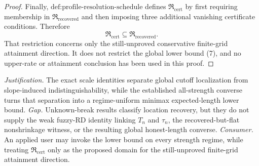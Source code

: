 \documentclass{article}
\begin{document}
\begin{proof}
Finally, \(\text{def:profile-resolution-schedule}\) defines \(\mathfrak R_{\mathrm{cert}}\) by first requiring membership in \(\mathfrak R_{\mathrm{recovered}}\) and then imposing three additional vanishing certificate conditions.  Therefore
\[
 \mathfrak R_{\mathrm{cert}}\subseteq\mathfrak R_{\mathrm{recovered}}.
\]
That restriction concerns only the still-unproved conservative finite-grid attainment direction.  It does not restrict the global lower bound (7), and no upper-rate or attainment conclusion has been used in this proof.
\end{proof}
\par\smallskip\noindent \textit{Justification.} The exact scale identities separate global cutoff localization from slope-induced indistinguishability, while the established all-strength converse turns that separation into a regime-uniform minimax expected-length lower bound. \textit{Gap.} Unknown-break results classify location recovery, but they do not supply the weak fuzzy-RD identity linking \(T_n\) and \(\tau_n\), the recovered-but-flat nonshrinkage witness, or the resulting global honest-length converse. \textit{Consumer.} An applied user may invoke the lower bound on every strength regime, while treating \(\mathfrak R_{\mathrm{cert}}\) only as the proposed domain for the still-unproved finite-grid attainment direction.
\end{document}

